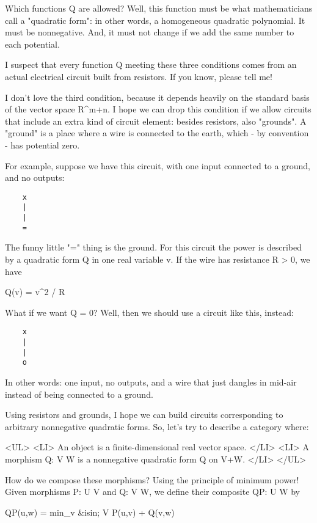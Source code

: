 Which functions Q are allowed?  Well, this function must be what
mathematicians call a "quadratic form": in other words, a
homogeneous quadratic polynomial.  It must be nonnegative.  And, it
must not change if we add the same number to each potential.

I suspect that every function Q meeting these three conditions comes
from an actual electrical circuit built from resistors.  If you know,
please tell me!  

I don't love the third condition, because it depends heavily on the
standard basis of the vector space R^{m+n}.  I hope we can
drop this condition if we allow circuits that include an extra kind of
circuit element: besides resistors, also "grounds".  A
"ground" is a place where a wire is connected to the earth,
which - by convention - has potential zero.

For example, suppose we have this circuit, with one input connected 
to a ground, and no outputs:

\begin{verbatim}
    x
    |
    |
    =
\end{verbatim}
    

The funny little "=" thing is the ground.  For this circuit the power
is described by a quadratic form Q in one real variable v.  If the
wire has resistance R > 0, we have

Q(v) = v^{2} / R

What if we want Q = 0?  Well, then we should use a circuit like this,
instead:

\begin{verbatim}
    x
    |
    |
    o
\end{verbatim}
    
In other words: one input, no outputs, and a wire that just dangles in
mid-air instead of being connected to a ground.

Using resistors and grounds, I hope we can build circuits corresponding 
to arbitrary nonnegative quadratic forms.  So, let's try to describe a
category where:

<UL>
<LI>
  An object is a finite-dimensional real vector space.  
</LI>
<LI>
  A morphism Q: V \to  W is a nonnegative quadratic form Q on V+W.
</LI>
</UL>

How do we compose these morphisms?  Using the principle of minimum
power!  Given morphisms P: U \to  V and Q: V \to  W, we define their
composite QP: U \to  W by

QP(u,w) = min_{v &isin; V} P(u,v) + Q(v,w)

